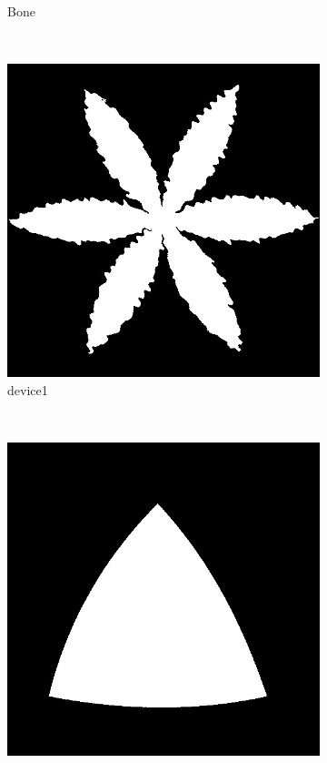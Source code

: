\documentclass[a4paper,psfig,subfigure,epsfig,fleqn,amssmb,float,caption,fontenc,ausarbeitung]{article}
\begin{document}
\begin{figure}
\begin{subfigure}[b]{0.3\textwidth}
		\caption{Bone}
	\end{subfigure}
	~
	\begin{subfigure}[b]{0.3\textwidth}
		\includegraphics[width=\textwidth]{img/device1}
		\caption{device1}
	\end{subfigure}
	~
	\begin{subfigure}[b]{0.3\textwidth}
		\includegraphics[width=\textwidth]{img/device4}

\end{subfigure}
\end{figure}
\end{document}
